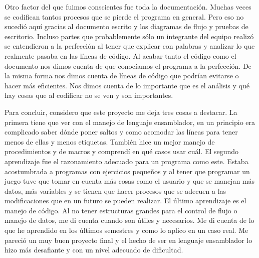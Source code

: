 \documentclass[12pt]{article}
\begin{document}
Otro factor del que fuimos conscientes fue toda la documentación. Muchas veces se codifican tantos procesos que se pierde el programa en general. Pero eso no sucedió aquí gracias al documento escrito y los diagramas de flujo y pruebas de escritorio. Incluso partes que probablemente sólo un integrante del equipo realizó se entendieron a la perfección al tener que explicar con palabras y analizar lo que realmente pasaba en las líneas de código. Al acabar tanto el código como el documento nos dimos cuenta de que conocíamos el programa a la perfección. De la misma forma nos dimos cuenta de líneas de código que podrían evitarse o hacer más eficientes. Nos dimos cuenta de lo importante que es el análisis y qué hay cosas que al codificar no se ven y son importantes. 

Para concluir, considero que este proyecto me deja tres cosas a destacar. La primera tiene que ver con el manejo de lenguaje ensamblador, en un principio era complicado saber dónde poner saltos y como acomodar las líneas para tener menos de ellas y menos etiquetas. También hice un mejor manejo de procedimientos y de macros y comprendí en qué casos usar cuál. El segundo aprendizaje fue el razonamiento adecuado para un programa como este. Estaba acostumbrada a programas con ejercicios pequeños y al tener que programar un juego tuve que tomar en cuenta más cosas como el usuario y que se manejan más datos, más variables y se tienen que hacer procesos que se adecuen a las modificaciones que en un futuro se pueden realizar. El último aprendizaje es el manejo de código. Al no tener estructuras grandes para el control de flujo o manejo de datos, me di cuenta cuando son útiles y necesarios. Me di cuenta de lo que he aprendido en los últimos semestres y como lo aplico en un caso real. Me pareció un muy buen proyecto final y el hecho de ser en lenguaje ensamblador lo hizo más desafiante y con un nivel adecuado de dificultad.
\end{document}
